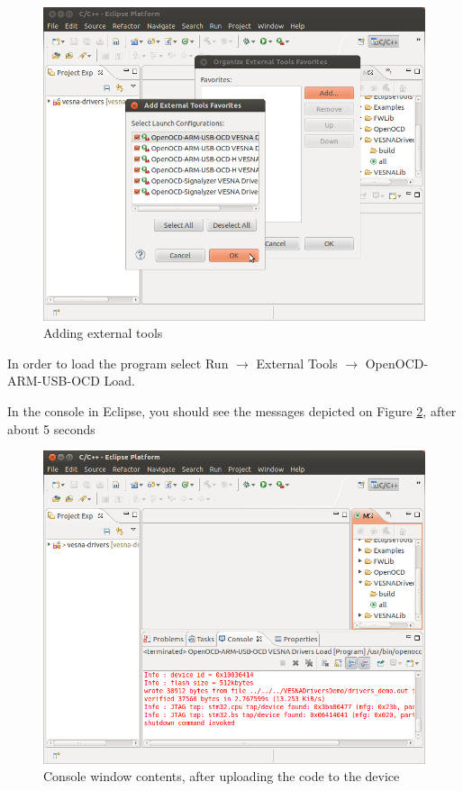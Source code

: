\documentclass[a4paper, 10pt]{article}
\begin{document}
    \begin{figure}[H]
    \centering
        \includegraphics[width=\textwidth]{./install-guide-linux-images/compile-external-tools.png}
        \caption{Adding external tools}
        \label{fig:compile-external-tools}
    \end{figure}

In order to load the program select
Run $\rightarrow$ External Tools $\rightarrow$ OpenOCD-ARM-USB-OCD Load.

In the console in Eclipse, you should see the messages depicted on
Figure \ref{fig:load-successful},
after about 5 seconds


    \begin{figure}[H]
    \centering
        \includegraphics[width=\textwidth]{./install-guide-linux-images/load-successful.png}
        \caption{Console window contents, after uploading the code to the device}
        \label{fig:load-successful}
    \end{figure}
\end{document}
